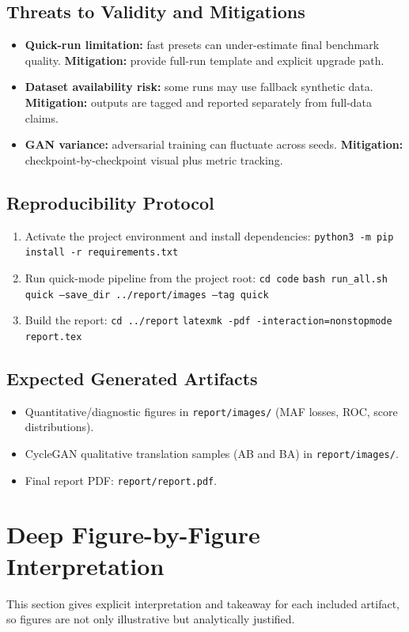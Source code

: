\documentclass[conference]{IEEEtran}
\begin{document}
\subsection{Threats to Validity and Mitigations}
\begin{itemize}
    \item \textbf{Quick-run limitation:} fast presets can under-estimate final benchmark quality. \textbf{Mitigation:} provide full-run template and explicit upgrade path.
    \item \textbf{Dataset availability risk:} some runs may use fallback synthetic data. \textbf{Mitigation:} outputs are tagged and reported separately from full-data claims.
    \item \textbf{GAN variance:} adversarial training can fluctuate across seeds. \textbf{Mitigation:} checkpoint-by-checkpoint visual plus metric tracking.
\end{itemize}

\subsection{Reproducibility Protocol}
\begin{enumerate}
\item Activate the project environment and install dependencies:
\texttt{python3 -m pip install -r requirements.txt}
\item Run quick-mode pipeline from the project root:
\texttt{cd code}
\texttt{bash run\_all.sh quick --save\_dir ../report/images --tag quick}
\item Build the report:
\texttt{cd ../report}
\texttt{latexmk -pdf -interaction=nonstopmode report.tex}
\end{enumerate}

\subsection{Expected Generated Artifacts}
\begin{itemize}
    \item Quantitative/diagnostic figures in \texttt{report/images/} (MAF losses, ROC, score distributions).
    \item CycleGAN qualitative translation samples (A\textrightarrow{}B and B\textrightarrow{}A) in \texttt{report/images/}.
    \item Final report PDF: \texttt{report/report.pdf}.
\end{itemize}

\section{Deep Figure-by-Figure Interpretation}
This section gives explicit interpretation and takeaway for each included artifact, so figures are not only illustrative but analytically justified.
\end{document}
